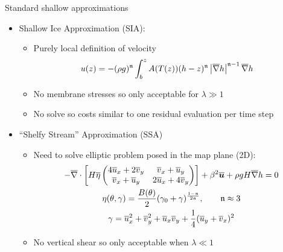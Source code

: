 \begin{frame}{Standard shallow approximations}
  \begin{itemize}
  \item Shallow Ice Approximation (SIA):
    \begin{itemize}
    \item Purely local definition of velocity
      \begin{align*}
        u(z) &= - (\rho g)^{\mathfrak n} \int_b^z A(T(z))
        (h-z)^{\mathfrak n} \left\lvert \overline\nabla h \right\rvert^{\mathfrak n-1} \overline\nabla h
      \end{align*}
    \item No membrane stresses so only acceptable for \alert<2>{$\lambda \gg 1$}
    \item No solve so costs similar to one residual evaluation per time step
    \end{itemize}
  \item ``Shelfy Stream'' Approximation (SSA)
    \begin{itemize}
    \item Need to solve elliptic problem posed in the map plane (2D):
      \begin{gather*}
        -\bar\nabla\cdot \left[H \bar\eta
          \begin{pmatrix}
            4\bar u_x + 2\bar v_y & \bar v_x + \bar u_y \\
            \bar v_x + \bar u_y   & 2\bar u_x + 4\bar v_y
          \end{pmatrix} \right]
        + \beta^2 \bm{\bar u} + \rho g H \bar\grad h = 0 \\
        \eta(\theta,\gamma) = \frac{B(\theta)}{2} (\gamma_0 + \gamma)^{\frac{1-\mathfrak n}{2\mathfrak n}}, \qquad \mathfrak n \approx 3 \\
        \gamma = \bar u_x^2 + \bar v_y^2 + \bar u_x\bar v_y + \frac 1 4 (\bar u_y+\bar v_x)^2 %
      \end{gather*}
    \item No vertical shear so only acceptable when \alert<2>{$\lambda \ll 1$}
    \end{itemize}
  \end{itemize}
\end{frame}


